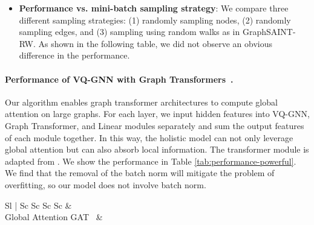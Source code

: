 \documentclass{article}
\newcommand{\cm}{\paragraph}
\begin{document}
\begin{itemize}[leftmargin=*, topsep=1.5pt]
    \item \textbf{Performance vs. mini-batch sampling strategy}: We compare three different sampling strategies: (1) randomly sampling nodes, (2) randomly sampling edges, and (3) sampling using random walks as in GraphSAINT-RW. As shown in the following table, we did not observe an obvious difference in the performance.
\begin{table}[H]
\end{table}
\end{itemize}

\cm{Performance of VQ-GNN with Graph Transformers~\citep{yaronlipman2020global}.} Our algorithm enables graph transformer architectures to compute global attention on large graphs. For each layer, we input hidden features into VQ-GNN, Graph Transformer, and Linear modules separately and sum the output features of each module together. In this way, the holistic model can not only leverage global attention but can also absorb local information. The transformer module is adapted from \citep{yaronlipman2020global}. We show the performance in Table \ref{tab:performance-powerful}. We find that the removal of the batch norm will mitigate the problem of overfitting, so our model does not involve batch norm.

\begin{table}[ht]
\centering
\caption{\label{tab:performance-powerful}Performance of VQ-GNN with Graph Transformer Backbone on the \textit{ogbn-arxiv} benchmark.}
\begin{tabular}{Sl | Sc Sc Sc Sc} \toprule
{} &   \\ \midrule
Global Attention  GAT~\citep{yaronlipman2020global} &   \\ \bottomrule
\end{tabular}
\end{table}





%
 
\end{document}
